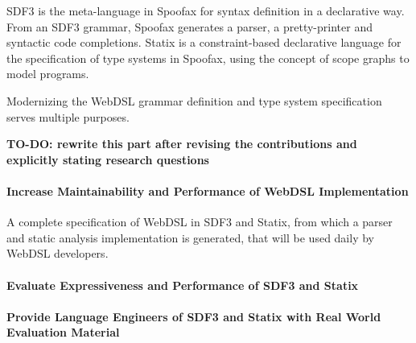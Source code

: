     SDF3 \autocite{VollebregtKV12,AmorimV20} is the meta-language in Spoofax for syntax definition in a declarative way. From an SDF3 grammar, Spoofax generates a parser, a pretty-printer and syntactic code completions. Statix \autocite{VanAntwerpen2018} is a constraint-based declarative language for the specification of type systems in Spoofax, using the concept of scope graphs \autocite{Neron2015} to model programs.

    Modernizing the WebDSL grammar definition and type system specification serves multiple purposes.

    \textbf{TO-DO: rewrite this part after revising the contributions and explicitly stating research questions}

    \paragraph{Increase Maintainability and Performance of WebDSL Implementation} A complete specification of WebDSL in SDF3 and Statix, from which a parser and static analysis implementation is generated, that will be used daily by WebDSL developers.

    \paragraph{Evaluate Expressiveness and Performance of SDF3 and Statix}

    \paragraph{Provide Language Engineers of SDF3 and Statix with Real World Evaluation Material}
